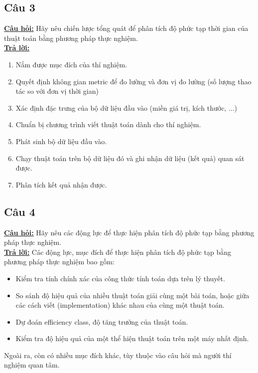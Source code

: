 \documentclass[a4paper 14pt]{extarticle}
\begin{document}
\begin{flushleft}
		\subsection{Câu 3}
		\underline{\textbf{Câu hỏi:}} Hãy nêu chiến lược tổng quát để phân tích độ phức tạp thời gian của thuật toán bằng phương pháp thực nghiệm.\\
		\underline{\textbf{Trả lời:}}  \\
		\begin{enumerate}
			\item Nắm được mục đích của thí nghiệm.
			\item Quyết định không gian metric để đo lường và đơn vị đo lường (số lượng thao tác so với đơn vị thời gian)
			\item Xác định đặc trưng của bộ dữ liệu đầu vào (miền giá trị, kích thước, ...)
			\item Chuẩn bị chương trình viết thuật toán dành cho  thí nghiệm.
			\item Phát sinh bộ dữ liệu đầu vào.
			\item Chạy thuật toán trên bộ dữ liệu đó và ghi nhận dữ liệu (kết quả) quan sát được.
			\item Phân tích kết quả nhận được.
		\end{enumerate}
		\subsection{Câu 4}
		\underline{\textbf{Câu hỏi:}} Hãy nêu các động lực để thực hiện phân tích độ phức tạp bằng phương pháp thực nghiệm.\\
		\underline{\textbf{Trả lời:}} Các động lực, mục đích để thực hiện phân tích độ phức tạp bằng phương pháp thực nghiệm bao gồm:\\
		\begin{itemize}
			\item Kiểm tra tính chính xác của công thức tính toán dựa trên lý thuyết.
			\item So sánh độ hiệu quả của nhiều thuật toán giải cùng một bài toán, hoặc giữa các cách viết (implementation) khác nhau của cùng một thuật toán.
			\item Dự đoán efficiency class, độ tăng trưởng của thuật toán.
			\item Kiểm tra độ hiệu quả của một thể hiện thuật toán trên một máy nhất định.
		\end{itemize}
		Ngoài ra, còn có nhiều mục đích khác, tùy thuộc vào câu hỏi mà người thí nghiệm quan tâm.

\end{flushleft}
\end{document}
